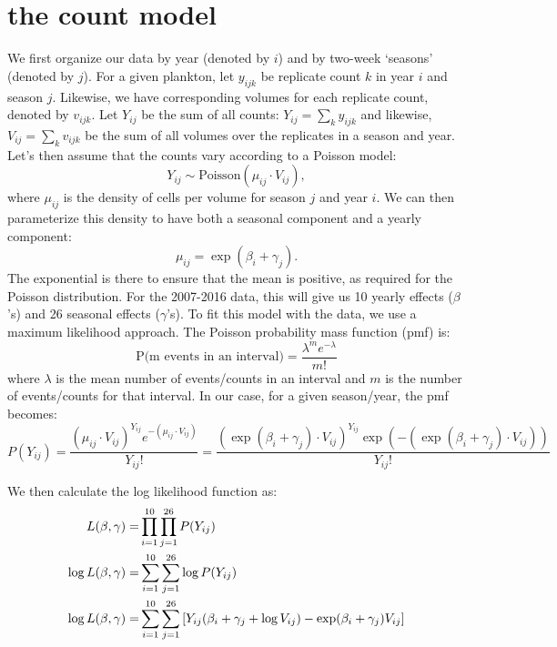 \documentclass[11pt]{article}
\begin{document}
\section{the count model}

We first organize our data by year (denoted by $i$) and by two-week `seasons' (denoted by $j$). For a given plankton, let $y_{ijk}$ be replicate count $k$ in year $i$ and season $j$. Likewise, we have corresponding volumes for each replicate count, denoted by $v_{ijk}$. Let $Y_{ij}$ be the sum of all counts:
$Y_{ij}=\sum_ky_{ijk} $ and likewise, $V_{ij}=\sum_k v_{ijk}$ be the sum of all volumes over the replicates in a season and year. Let's then assume that the counts vary according to a Poisson model:
\[
Y_{ij} \sim \text{Poisson}(\mu_{ij} \cdot V_{ij}),
\]
where $\mu_{ij}$ is the density of cells per volume for season $j$ and year $i$. We can then parameterize this density to have both a seasonal component and a yearly component:
\[
\mu_{ij}=\exp(\beta_i + \gamma_j).
\]
The exponential is there to ensure that the mean is positive, as required for the Poisson distribution. For the 2007-2016 data, this will give us 10 yearly effects ($\beta$'s) and 26 seasonal effects ($\gamma$'s). To fit this model with the data, we use a maximum likelihood approach. The Poisson probability mass function (pmf) is:
\[
\text{P(m events in an interval)} =  \frac{\lambda^me^{-\lambda}}{m!}
\]
where $\lambda$ is the mean number of events/counts in an interval and $m$ is the number of events/counts for that interval. In our case, for a given season/year, the pmf becomes:
\[
P(Y_{ij}) =  \frac{(\mu_{ij}\cdot V_{ij})^{Y_{ij}}    e^{-(\mu_{ij} \cdot V_{ij})}   } {Y_{ij}!} =  \frac{(\exp(\beta_i + \gamma_j)\cdot V_{ij})^{Y_{ij}}    \exp(-(\exp(\beta_i + \gamma_j) \cdot V_{ij}))   } {Y_{ij}!}
\]

We then calculate the log likelihood function as:
\begin{align}
\notag
L(\mathbf{\beta},\mathbf{\gamma}) =& \prod_{i=1}^{10} \prod_{j=1}^{26} P(Y_{ij}) \\\notag
\log L(\mathbf{\beta},\mathbf{\gamma}) =& \sum_{i=1}^{10} \sum_{j=1}^{26} \log P(Y_{ij}) \\\notag
\log L(\mathbf{\beta},\mathbf{\gamma}) =& \sum_{i=1}^{10} \sum_{j=1}^{26} \left[ Y_{ij} ( \beta_i + \gamma_j + \log V_{ij}) - \exp(\beta_i + \gamma_j) V_{ij} \right]
\end{align}
\end{document}
